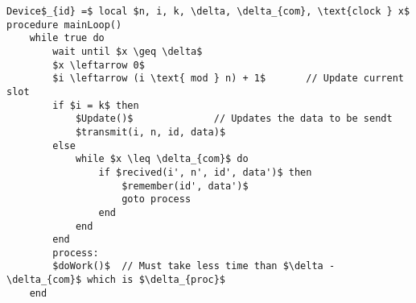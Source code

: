\begin{minipage}{\linewidth} %

\begin{lstlisting}[style=pseudocode,mathescape=true,caption={Pseudocode example of the main loop}] 
Device$_{id} =$ local $n, i, k, \delta, \delta_{com}, \text{clock } x$ 
procedure mainLoop()
    while true do
        wait until $x \geq \delta$
        $x \leftarrow 0$
        $i \leftarrow (i \text{ mod } n) + 1$       // Update current slot
        if $i = k$ then
            $Update()$              // Updates the data to be sendt
            $transmit(i, n, id, data)$
        else 
            while $x \leq \delta_{com}$ do
                if $recived(i', n', id', data')$ then
                    $remember(id', data')$
                    goto process
                end
            end
        end
        process:
        $doWork()$  // Must take less time than $\delta - \delta_{com}$ which is $\delta_{proc}$    
    end
\end{lstlisting}  
\end{minipage}
            
